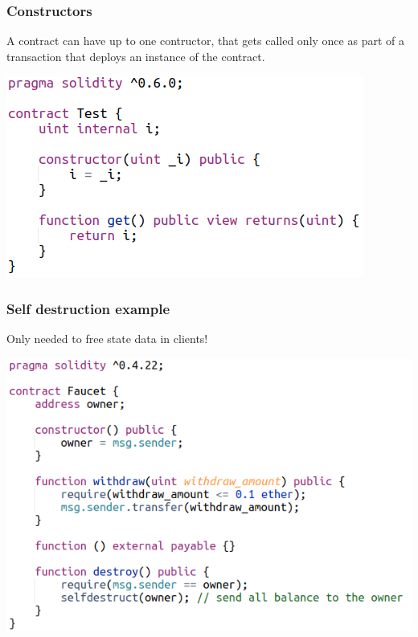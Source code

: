 \documentclass[11pt]{beamer}  %
\begin{document}
\begin{frame}\frametitle{Constructors}
  \begin{greenbox}{}
    A contract \alert{can} have \alert{up to one} contructor, that gets called
    only once as part of a transaction that deploys an instance
    of the contract.
  \end{greenbox}

  \begin{center}
    \includegraphics[scale=0.55,clip=false]{pictures/constructor.png}
  \end{center}

\end{frame}

\begin{frame}\frametitle{Self destruction example}

  Only needed to free state data in clients!

  \begin{center}
    \includegraphics[scale=0.5,clip=false]{pictures/selfdestruct.png}
  \end{center}

\end{frame}
\end{document}
